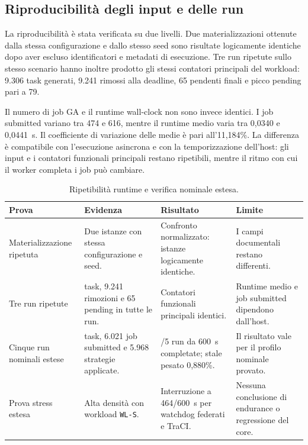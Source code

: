 \subsection{Riproducibilità degli input e delle run}
\label{subsec:exp_riproducibilita}

La riproducibilità è stata verificata su due livelli. Due materializzazioni ottenute dalla stessa configurazione e dallo stesso seed sono risultate logicamente identiche dopo aver escluso identificatori e metadati di esecuzione. Tre run ripetute sullo stesso scenario hanno inoltre prodotto gli stessi contatori principali del workload: 9.306 task generati, 9.241 rimossi alla deadline, 65 pendenti finali e picco pending pari a 79.

Il numero di job GA e il runtime wall-clock non sono invece identici. I job submitted variano tra 474 e 616, mentre il runtime medio varia tra 0,0340 e 0,0441~s. Il coefficiente di variazione delle medie è pari all'11,184\%. La differenza è compatibile con l'esecuzione asincrona e con la temporizzazione dell'host: gli input e i contatori funzionali principali restano ripetibili, mentre il ritmo con cui il worker completa i job può cambiare.

\begin{table}[htbp]
    \centering
    \caption{Ripetibilità runtime e verifica nominale estesa.}
    \label{tab:exp_riproducibilita}
    \small
    \begin{tabularx}{\textwidth}{
        >{\raggedright\arraybackslash}p{}
        >{\raggedright\arraybackslash}p{}
        >{\raggedright\arraybackslash}X
        >{\raggedright\arraybackslash}p{}
    }
        \toprule
        \textbf{Prova} &
        \textbf{Evidenza} &
        \textbf{Risultato} &
        \textbf{Limite} \\
        \midrule
        Materializzazione ripetuta &
        Due istanze con stessa configurazione e seed. &
        Confronto normalizzato: istanze logicamente identiche. &
        I campi documentali restano differenti. \\
        Tre run ripetute &
        9.306 task, 9.241 rimozioni e 65 pending in tutte le run. &
        Contatori funzionali principali identici. &
        Runtime medio e job submitted dipendono dall'host. \\
        Cinque run nominali estese &
        96.337 task, 6.021 job submitted e 5.968 strategie applicate. &
        5/5 run da 600~s completate; stale pesato 0,880\%. &
        Il risultato vale per il profilo nominale provato. \\
        Prova stress estesa &
        Alta densità con workload \texttt{WL-S}. &
        Interruzione a 464/600~s per watchdog federati e TraCI. &
        Nessuna conclusione di endurance o regressione del core. \\
        \bottomrule
    \end{tabularx}
\end{table}


